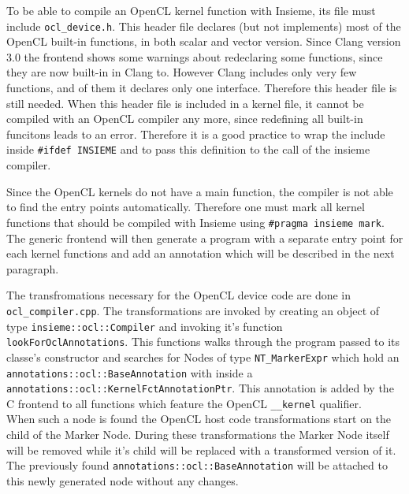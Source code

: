 To be able to compile an OpenCL kernel function with Insieme, its file must include \texttt{ocl\_device.h}. This header file declares (but not implements) most of the OpenCL built-in functions, in both scalar and vector version. Since Clang version 3.0 the frontend shows some warnings about redeclaring some functions, since they are now built-in in Clang to. However Clang includes only very few functions, and of them it declares only one interface. Therefore this header file is still needed. When this header file is included in a kernel file, it cannot be compiled with an OpenCL compiler any more, since redefining all built-in funcitons leads to an error. Therefore it is a good practice to wrap the include inside \texttt{\#ifdef INSIEME} and to pass this definition to the call of the insieme compiler. 

Since the OpenCL kernels do not have a main function, the compiler is not able to find the entry points automatically. Therefore one must mark all kernel functions that should be compiled with Insieme using \texttt{\#pragma insieme mark}. The generic frontend will then generate a program with a separate entry point for each kernel functions and add an annotation which will be described in the next paragraph.

The transfromations necessary for the OpenCL device code are done in \texttt{ocl\_compiler.cpp}. The transformations are invoked by creating an object of type \texttt{insieme::ocl::Compiler} and invoking it's function \texttt{lookForOclAnnotations}. This functions walks through the program passed to its classe's constructor and searches for Nodes of type \texttt{NT\_MarkerExpr} which hold an \texttt{annotations::ocl::BaseAnnotation} with inside a \texttt{annotations::ocl::KernelFctAnnotationPtr}. This annotation is added by the C frontend to all functions which feature the OpenCL \texttt{\_\_kernel} qualifier. \\

When such a node is found the OpenCL host code transformations start on the child of the Marker Node. During these transformations the Marker Node itself will be removed while it's child will be replaced with a transformed version of it. The previously found \texttt{annotations::ocl::BaseAnnotation} will be attached to this newly generated node without any changes. \\

